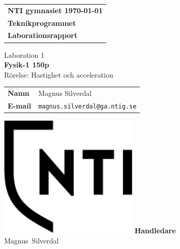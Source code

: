 \documentclass[11p, titlepage, oneside, a4paper]{article}
\makeatletter
\def\inst{Teknikprogrammet}
\def\typeofdoc{Laborationsrapport}
\def\course{Fysik-1 150p}
\def\pretitle{Laboration 1}
\def\title{Rörelse: Hastighet och acceleration}
\def\name{Magnus Silverdal}
\def\username{magnus.silverdal}
\def\email{\username{}@ga.ntig.se}
\def\graders{Magnus Silverdal}
\makeatother
\begin{document}
\begin{titlepage}
		\thispagestyle{empty}
		\begin{large}
			\begin{tabular}{@{}p{\textwidth}@{}}
				\textbf{NTI gymnasiet \hfill \today} \\
				\textbf{\inst} \\
				\textbf{\typeofdoc} \\
			\end{tabular}
		\end{large}
		\vspace{10mm}
		\begin{center}
			\LARGE{\pretitle} \\
			\huge{\textbf{\course}}\\
			\vspace{10mm}
			\LARGE{\title} \\
			\vspace{15mm}
			\begin{large}
				\begin{tabular}{ll}
					\textbf{Namn} & \name \\
					\textbf{E-mail} & \texttt{\email} \\
				\end{tabular}
			\end{large}
			\vfill
            \includegraphics[width=0.5\textwidth]{images/NTI Gymnasiet_Symbol_print_svart}
			\vfill
            \large{\textbf{Handledare}}\\
			\mbox{\large{\graders}}
		\end{center}
	\end{titlepage}

    \begin{otherlanguage}{english}
	\begin{abstract}
        This labb examines the change over velocity and acceleration of a wagon rolling down a slope.
        The experiment shows that the wagons velocity changes at a constant rate making the acceleration a constant linear line.
    \end{abstract}
    \end{otherlanguage}
	\tableofcontents
	
\end{document}
